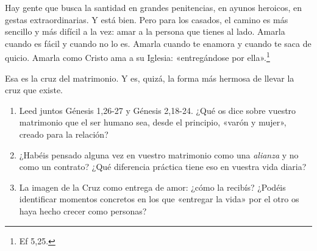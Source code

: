 Hay gente que busca la santidad en grandes penitencias, en ayunos heroicos, en gestas extraordinarias. Y está bien. Pero para los casados, el camino es más sencillo y más difícil a la vez: amar a la persona que tienes al lado. Amarla cuando es fácil y cuando no lo es. Amarla cuando te enamora y cuando te saca de quicio. Amarla como Cristo ama a su Iglesia: «entregándose por ella».\footnote{Ef 5,25.}

Esa es la cruz del matrimonio. Y es, quizá, la forma más hermosa de llevar la cruz que existe.

\paracaminar

\begin{enumerate}
  \item Leed juntos Génesis 1,26-27 y Génesis 2,18-24. ¿Qué os dice sobre vuestro matrimonio que el ser humano sea, desde el principio, «varón y mujer», creado para la relación?

  \item ¿Habéis pensado alguna vez en vuestro matrimonio como una \emph{alianza} y no como un contrato? ¿Qué diferencia práctica tiene eso en vuestra vida diaria?

  \item La imagen de la Cruz como entrega de amor: ¿cómo la recibís? ¿Podéis identificar momentos concretos en los que «entregar la vida» por el otro os haya hecho crecer como personas?
\end{enumerate}

